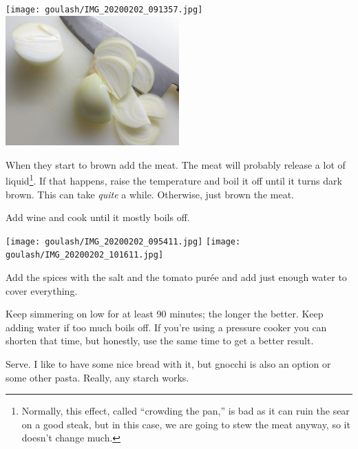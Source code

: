 \begin{recipe}
{        \texttt{[image: goulash/IMG\_20200202\_091357.jpg]}%
        \includegraphics[width=0.5\textwidth]{goulash/IMG_20200202_091811.jpg}


        \step When they start to brown add the meat. The meat will probably release a lot of liquid\footnote{ Normally, this effect, called ``crowding the pan,'' is bad as it can ruin the sear on a good steak, but in this case, we are going to stew the meat anyway, so it doesn’t change much.}. If that happens, raise the temperature and boil it off until it turns dark brown. This can take \textit{quite} a while. Otherwise, just brown the meat.

        \step Add wine and cook until it mostly boils off.

    	\vspace{1em}

        \texttt{[image: goulash/IMG\_20200202\_095411.jpg]}%
        \texttt{[image: goulash/IMG\_20200202\_101611.jpg]}

        \step Add the spices with the salt and the tomato pur\'ee and add just enough water to cover everything.

        \step Keep simmering on low for at least 90 minutes; the longer the better. Keep adding water if too much boils off. If you’re using a pressure cooker you can shorten that time, but honestly, use the same time to get a better result.

        \step Serve. I like to have some nice bread with it, but gnocchi is also an option or some other pasta. Really, any starch works.
    }
\end{recipe}